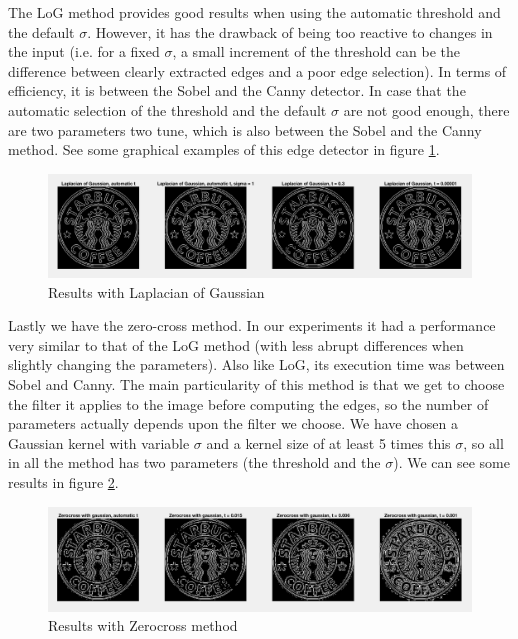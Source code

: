 The LoG method provides good results when using the automatic threshold and the default $\sigma$.
However, it has the drawback of being too reactive to changes in the input (i.e. for a fixed
$\sigma$, a small increment of the threshold can be the difference between clearly extracted edges
and a poor edge selection). In terms of efficiency, it is between the Sobel and the Canny detector.
In case that the automatic selection of the threshold and the default $\sigma$ are not good enough,
there are two parameters two tune, which is also between the Sobel and the Canny method. See some
graphical examples of this edge detector in figure \ref{fig:im4}.

\begin{figure}[!hbt]
  \includegraphics[width=\textwidth]{./img/ex1/im4.png}
  \caption{Results with Laplacian of Gaussian}
  \label{fig:im4}
\end{figure}

Lastly we have the zero-cross method. In our experiments it had a performance very similar to that of
the LoG method (with less abrupt differences when slightly changing the parameters). Also like LoG,
its execution time was between Sobel and Canny. The main particularity of this method is that
we get to choose the filter it applies to the image before computing the edges, so the number of
parameters actually depends upon the filter we choose. We have chosen a Gaussian kernel with
variable $\sigma$ and a kernel size of at least 5 times this $\sigma$, so all in all the method
has two parameters (the threshold and the $\sigma$). We can see some results in figure \ref{fig:im5}.

\begin{figure}[!hbt]
  \includegraphics[width=\textwidth]{./img/ex1/im5.png}
  \caption{Results with Zerocross method}
  \label{fig:im5}
\end{figure}

